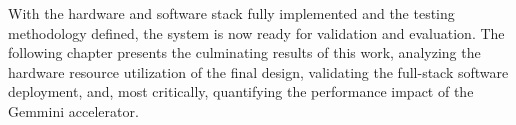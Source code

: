With the hardware and software stack fully implemented and the testing methodology defined, the system is now ready for validation and evaluation. The following chapter presents the culminating results of this work, analyzing the hardware resource utilization of the final design, validating the full-stack software deployment, and, most critically, quantifying the performance impact of the Gemmini accelerator.
